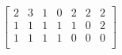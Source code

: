 \documentclass{article}
\begin{document}
 $
\left[
\begin{array}{c|c|c|c|c|c|c}
2 & 3 & 1 & 0 & 2 & 2 & 2 \\
1 & 1 & 1 & 1 & 1 & 0 & 2 \\
1 & 1 & 1 & 1 & 0 & 0 & 0 \\
\end{array}
\right] $
\end{document}
